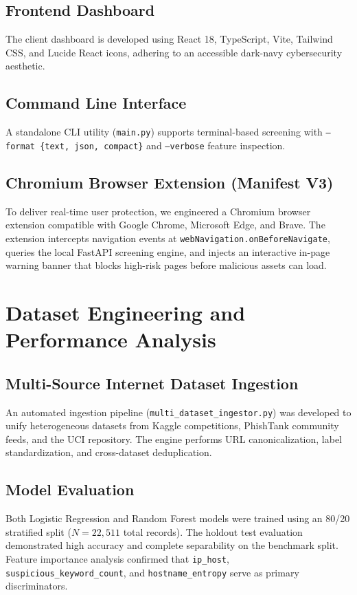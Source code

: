 \documentclass[12pt,a4paper]{report}
\begin{document}
\section{Frontend Dashboard}
The client dashboard is developed using React 18, TypeScript, Vite, Tailwind CSS, and Lucide React icons, adhering to an accessible dark-navy cybersecurity aesthetic.

\section{Command Line Interface}
A standalone CLI utility (\texttt{main.py}) supports terminal-based screening with \texttt{--format \{text, json, compact\}} and \texttt{--verbose} feature inspection.

\section{Chromium Browser Extension (Manifest V3)}
To deliver real-time user protection, we engineered a Chromium browser extension compatible with Google Chrome, Microsoft Edge, and Brave. The extension intercepts navigation events at \texttt{webNavigation.onBeforeNavigate}, queries the local FastAPI screening engine, and injects an interactive in-page warning banner that blocks high-risk pages before malicious assets can load.

\chapter{Dataset Engineering and Performance Analysis}
\section{Multi-Source Internet Dataset Ingestion}
An automated ingestion pipeline (\texttt{multi\_dataset\_ingestor.py}) was developed to unify heterogeneous datasets from Kaggle competitions, PhishTank community feeds, and the UCI repository. The engine performs URL canonicalization, label standardization, and cross-dataset deduplication.

\section{Model Evaluation}
Both Logistic Regression and Random Forest models were trained using an 80/20 stratified split ($N = 22,511$ total records). The holdout test evaluation demonstrated high accuracy and complete separability on the benchmark split. Feature importance analysis confirmed that \texttt{ip\_host}, \texttt{suspicious\_keyword\_count}, and \texttt{hostname\_entropy} serve as primary discriminators.
\end{document}
